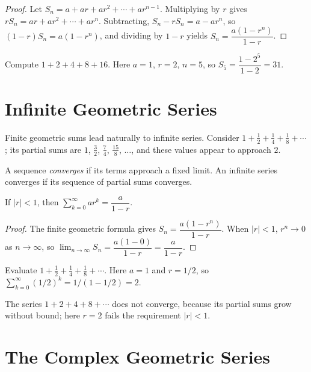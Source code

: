 \begin{proof}
Let $S_n = a+ar+ar^2+\cdots+ar^{n-1}$. Multiplying by $r$ gives $rS_n =
ar+ar^2+\cdots+ar^n$. Subtracting, $S_n - rS_n = a - ar^n$, so $(1-r)S_n
= a(1-r^n)$, and dividing by $1-r$ yields $S_n = \dfrac{a(1-r^n)}{1-r}$.
\end{proof}

\begin{example}
Compute $1+2+4+8+16$. Here $a=1$, $r=2$, $n=5$, so $S_5 =
\dfrac{1-2^5}{1-2} = 31$.
\end{example}

\section{Infinite Geometric Series}

Finite geometric sums lead naturally to infinite series. Consider
$1+\tfrac12+\tfrac14+\tfrac18+\cdots$; its partial sums are $1$,
$\tfrac32$, $\tfrac74$, $\tfrac{15}{8}$, $\dots$, and these values appear
to approach $2$.

\begin{definition}
A sequence \emph{converges} if its terms approach a fixed limit. An
infinite series converges if its sequence of partial sums converges.
\end{definition}

\begin{theorem}
If $|r|<1$, then $\displaystyle\sum_{k=0}^\infty ar^k = \dfrac{a}{1-r}$.
\end{theorem}

\begin{proof}
The finite geometric formula gives $S_n = \dfrac{a(1-r^n)}{1-r}$. When
$|r|<1$, $r^n \to 0$ as $n\to\infty$, so $\lim_{n\to\infty} S_n =
\dfrac{a(1-0)}{1-r} = \dfrac{a}{1-r}$.
\end{proof}

\begin{example}
Evaluate $1+\tfrac12+\tfrac14+\tfrac18+\cdots$. Here $a=1$ and $r=1/2$,
so $\sum_{k=0}^\infty (1/2)^k = 1/(1-1/2) = 2$.
\end{example}

\begin{example}
The series $1+2+4+8+\cdots$ does not converge, because its partial sums
grow without bound; here $r=2$ fails the requirement $|r|<1$.
\end{example}

\section{The Complex Geometric Series}

